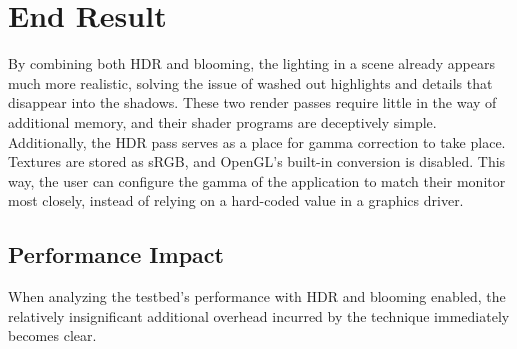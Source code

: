 \documentclass[11pt, oneside]{report}
\begin{document}
\section{End Result}
By combining both \gls{HDR} and blooming, the lighting in a scene already appears much more realistic, solving the issue of washed out highlights and details that disappear into the shadows. These two render passes require little in the way of additional memory, and their \gls{shader} programs are deceptively simple. Additionally, the \gls{HDR} pass serves as a place for gamma correction to take place. Textures are stored as sRGB, and \gls{OpenGL}'s built-in conversion is disabled. This way, the user can configure the gamma of the application to match their monitor most closely, instead of relying on a hard-coded value in a graphics driver.

\subsection{Performance Impact}
When analyzing the testbed's performance with \gls{HDR} and blooming enabled, the relatively insignificant additional overhead incurred by the technique immediately becomes clear.
\end{document}
